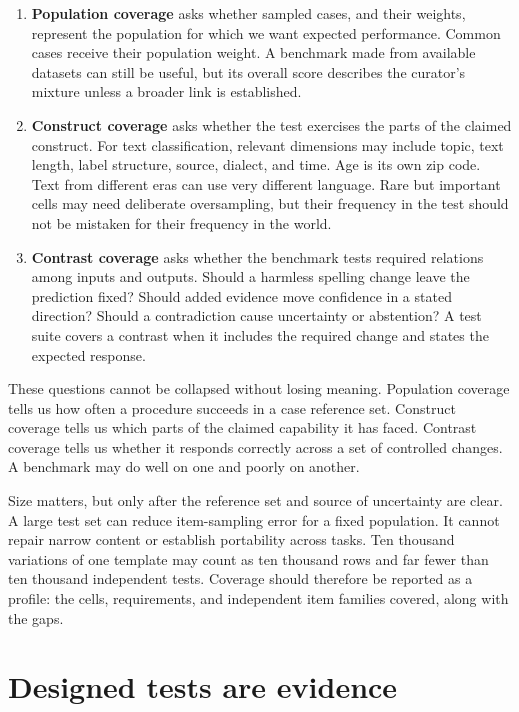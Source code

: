 \documentclass[11pt]{article}
\begin{document}
\begin{enumerate}
  \item \textbf{Population coverage} asks whether sampled cases, and their weights, represent the population for which we want expected performance. Common cases receive their population weight. A benchmark made from available datasets can still be useful, but its overall score describes the curator's mixture unless a broader link is established.
  \item \textbf{Construct coverage} asks whether the test exercises the parts of the claimed construct. For text classification, relevant dimensions may include topic, text length, label structure, source, dialect, and time. Age is its own zip code. Text from different eras can use very different language. Rare but important cells may need deliberate oversampling, but their frequency in the test should not be mistaken for their frequency in the world.
  \item \textbf{Contrast coverage} asks whether the benchmark tests required relations among inputs and outputs. Should a harmless spelling change leave the prediction fixed? Should added evidence move confidence in a stated direction? Should a contradiction cause uncertainty or abstention? A test suite covers a contrast when it includes the required change and states the expected response.
\end{enumerate}

These questions cannot be collapsed without losing meaning. Population coverage tells us how often a procedure succeeds in a case reference set. Construct coverage tells us which parts of the claimed capability it has faced. Contrast coverage tells us whether it responds correctly across a set of controlled changes. A benchmark may do well on one and poorly on another.

Size matters, but only after the reference set and source of uncertainty are clear. A large test set can reduce item-sampling error for a fixed population. It cannot repair narrow content or establish portability across tasks. Ten thousand variations of one template may count as ten thousand rows and far fewer than ten thousand independent tests. Coverage should therefore be reported as a profile: the cells, requirements, and independent item families covered, along with the gaps.

\section*{Designed tests are evidence}
\end{document}
